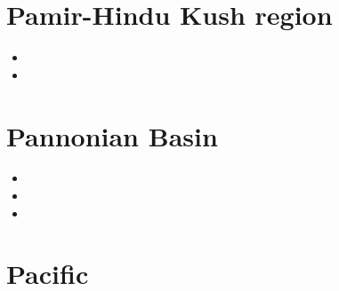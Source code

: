 \section{Pamir-Hindu Kush region}

\begin{small}
\begin{itemize}
\item[\twothousandseven]
\item[\twothousandsixteen]
\end{itemize}
\end{small}

\section{Pannonian Basin}

\begin{small}
\begin{itemize}
\item[\twothousandone]
\item[\twothousandtwo]
\item[\twothousandtwentyone]
\end{itemize}
\end{small}

\section{Pacific}

